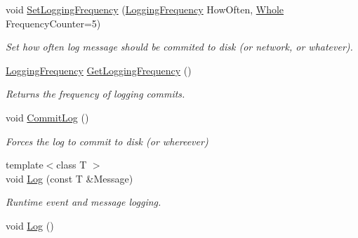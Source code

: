 \begin{DoxyCompactItemize}
void \hyperlink{classphys_1_1World_ab99299b841603b035eac217924b01f11}{SetLoggingFrequency} (\hyperlink{classphys_1_1World_a8c754464edbb78270fa0ee1e395b963d}{LoggingFrequency} HowOften, \hyperlink{namespacephys_a460f6bc24c8dd347b05e0366ae34f34a}{Whole} FrequencyCounter=5)
\begin{DoxyCompactList}\small\item\em Set how often log message should be commited to disk (or network, or whatever). \item\end{DoxyCompactList}\item 
\hyperlink{classphys_1_1World_a8c754464edbb78270fa0ee1e395b963d}{LoggingFrequency} \hyperlink{classphys_1_1World_a17c8c584fc80d8d4734b3c5a9c449ec1}{GetLoggingFrequency} ()
\begin{DoxyCompactList}\small\item\em Returns the frequency of logging commits. \item\end{DoxyCompactList}\item 
void \hyperlink{classphys_1_1World_ae2b1c8d6e96f94d329769abbd43ab1d2}{CommitLog} ()
\begin{DoxyCompactList}\small\item\em Forces the log to commit to disk (or whereever) \item\end{DoxyCompactList}\item 
{\footnotesize template$<$class T $>$ }\\void \hyperlink{classphys_1_1World_a4ab573bc3b060d6b3f58483bab04fca2}{Log} (const T \&Message)
\begin{DoxyCompactList}\small\item\em Runtime event and message logging. \item\end{DoxyCompactList}\item 
\hypertarget{classphys_1_1World_a7dbf83226aaa109a09efab00ae682761}{
void \hyperlink{classphys_1_1World_a7dbf83226aaa109a09efab00ae682761}{Log} ()}
\label{classphys_1_1World_a7dbf83226aaa109a09efab00ae682761}


\end{DoxyCompactItemize}
